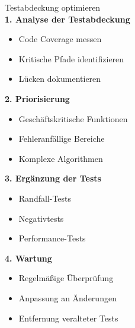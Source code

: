 \begin{KR}{Testabdeckung optimieren}\\
\textbf{1. Analyse der Testabdeckung}
\begin{itemize}
    \item Code Coverage messen
    \item Kritische Pfade identifizieren
    \item Lücken dokumentieren
\end{itemize}

\textbf{2. Priorisierung}
\begin{itemize}
    \item Geschäftskritische Funktionen
    \item Fehleranfällige Bereiche
    \item Komplexe Algorithmen
\end{itemize}

\textbf{3. Ergänzung der Tests}
\begin{itemize}
    \item Randfall-Tests
    \item Negativtests
    \item Performance-Tests
\end{itemize}

\textbf{4. Wartung}
\begin{itemize}
    \item Regelmäßige Überprüfung
    \item Anpassung an Änderungen
    \item Entfernung veralteter Tests
\end{itemize}
\end{KR}

